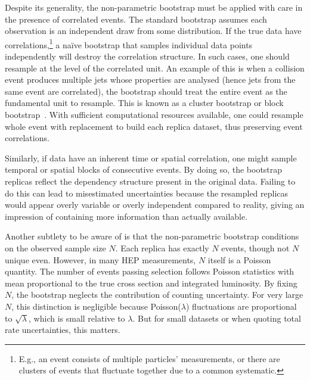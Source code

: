             Despite its generality, the non-parametric bootstrap must be applied with care in the presence of correlated events.
            The standard bootstrap assumes each observation is an independent draw from some distribution.
            If the true data have correlations,\footnote{E.g., an event consists of multiple particles' measurements, or there are clusters of events that fluctuate together due to a common systematic.} a na\"ive bootstrap that samples individual data points independently will destroy the correlation structure.
            In such cases, one should resample at the level of the correlated unit.
            An example of this is when a collision event produces multiple jets whose properties are analysed (hence jets from the same event are correlated), the bootstrap should treat the entire event as the fundamental unit to resample.
            This is known as a cluster bootstrap or block bootstrap~\cite{cameron_bootstrap-based_2008, kunsch_jackknife_1989, field_bootstrapping_2007, mackinnon_cluster-robust_2022, loy_bootstrapping_2021}.
            With sufficient computational resources available, one could resample whole event with replacement to build each replica dataset, thus preserving event correlations.
            
            Similarly, if data have an inherent time or spatial correlation, one might sample temporal or spatial blocks of consecutive events.
            By doing so, the bootstrap replicas reflect the dependency structure present in the original data.
            Failing to do this can lead to misestimated uncertainties because the resampled replicas would appear overly variable or overly independent compared to reality, giving an impression of containing more information than actually available.

            Another subtlety to be aware of is that the non-parametric bootstrap conditions on the observed sample size $N$.
            Each replica has exactly $N$ events, though not $N$ unique even.
            However, in many HEP measurements, $N$ itself is a Poisson quantity.
            The number of events passing selection follows Poisson statistics with mean proportional to the true cross section and integrated luminosity.
            By fixing $N$, the bootstrap neglects the contribution of counting uncertainty.
            For very large $N$, this distinction is negligible because Poisson($\lambda$) fluctuations are proportional to $\sqrt{\lambda}$, which is small relative to $\lambda$.
            But for small datasets or when quoting total rate uncertainties, this matters.
            

